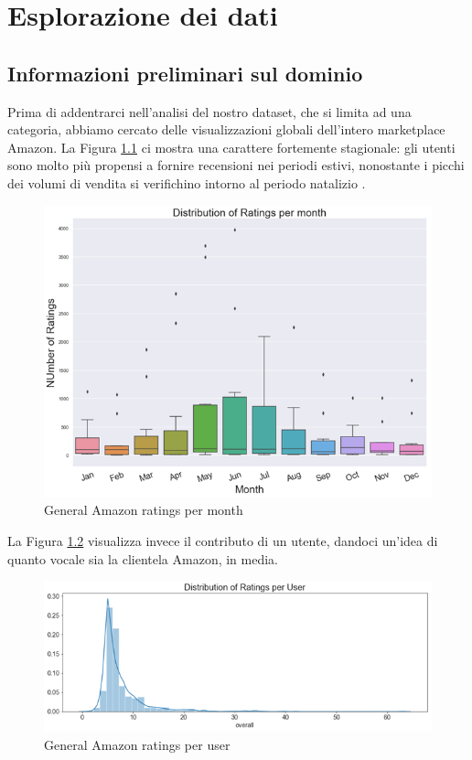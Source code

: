 \chapter{Esplorazione dei dati}
\label{exploration}

\section{Informazioni preliminari sul dominio}
Prima di addentrarci nell'analisi del nostro dataset, che si limita ad una categoria, abbiamo cercato delle visualizzazioni globali dell'intero marketplace Amazon. La Figura \ref{fig1} ci mostra una carattere fortemente stagionale: gli utenti sono molto più propensi a fornire recensioni nei periodi estivi, nonostante i picchi dei volumi di vendita si verifichino intorno al periodo natalizio \cite{trends}.
\par 

\begin{figure}[H]

  \centering
  \includegraphics[width=0.95\linewidth]{figures/ext/1_monthly.png}
  \caption{General Amazon ratings per month \cite{plots1}}
    \label{fig1}
\end{figure}

La Figura \ref{fig2} visualizza invece il contributo di un utente, dandoci un'idea di quanto vocale sia la clientela Amazon, in media.

\begin{figure}[H]

  \centering
  \includegraphics[width=1.1\linewidth]{figures/ext/1_peruser.png}
  \caption{General Amazon ratings per user \cite{plots1}}
  \label{fig2}
\end{figure}



